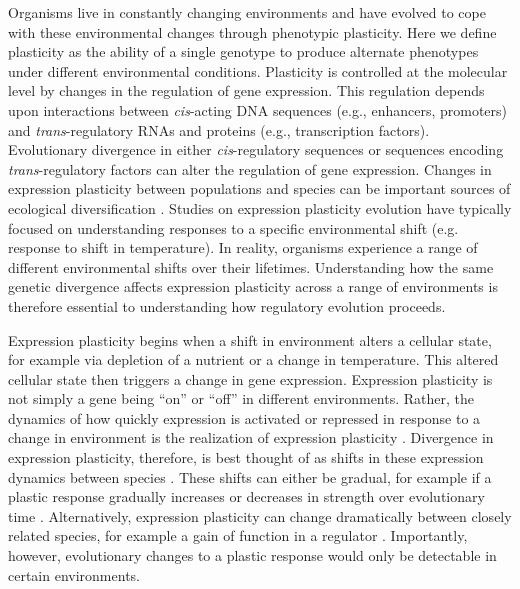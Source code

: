 Organisms live in constantly changing environments and have evolved to cope with these environmental changes through phenotypic plasticity. Here we define plasticity as the ability of a single genotype to produce alternate phenotypes under different environmental conditions. Plasticity is controlled at the molecular level by changes in the regulation of gene expression. This regulation depends upon interactions between \textit{cis}-acting DNA sequences (e.g., enhancers, promoters) and \textit{trans}-regulatory RNAs and proteins (e.g., transcription factors). Evolutionary divergence in either \textit{cis}-regulatory sequences or sequences encoding \textit{trans}-regulatory factors can alter the regulation of gene expression. Changes in expression plasticity between populations and species can be important sources of ecological diversification \cite{HodginsDavis2009, Lasky2014, Ghalambor2015, Makinen2018, Ballinger2023}. Studies on expression plasticity evolution have typically focused on understanding responses to a specific environmental shift (e.g. response to shift in temperature). In reality, organisms experience a range of different environmental shifts over their lifetimes. Understanding how the same genetic divergence affects expression plasticity across a range of environments is therefore essential to understanding how regulatory evolution proceeds.

Expression plasticity begins when a shift in environment alters a cellular state, for example via depletion of a nutrient or a change in temperature. This altered cellular state then triggers a change in gene expression. Expression plasticity is not simply a gene being ``on” or ``off” in different environments. Rather, the dynamics of how quickly expression is activated or repressed in response to a change in environment is the realization of expression plasticity \cite{Hager2009, Rivera2021, Wagh2023}. Divergence in expression plasticity, therefore, is best thought of as shifts in these expression dynamics between species \cite{Koster2015}. These shifts can either be gradual, for example if a plastic response gradually increases or decreases in strength over evolutionary time \cite{Makinen2018}. Alternatively, expression plasticity can change dramatically between closely related species, for example a gain of function in a regulator \cite{Soppe2000}. Importantly, however, evolutionary changes to a plastic response would only be detectable in certain environments.


